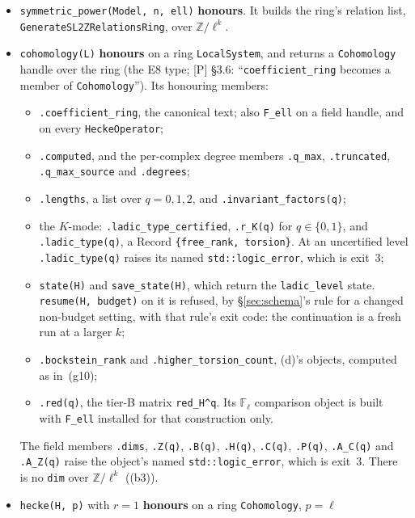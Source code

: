 \documentclass[11pt]{article}
\theoremstyle{remark}
\newcommand{\F}{\mathbb{F}}
\newcommand{\Z}{\mathbb{Z}}
\newcommand{\Fl}{\F_\ell}
\begin{document}
\begin{itemize}
\item \texttt{symmetric\_power(Model, n, ell)} \textbf{honours}. It builds the ring's relation
  list, \texttt{GenerateSL2ZRelationsRing}, over $\Z/\ell^k$.
\item \texttt{cohomology(L)} \textbf{honours} on a ring \texttt{LocalSystem}, and returns a
  \texttt{Cohomology} handle over the ring (the E8 type; [P] \S3.6: ``\texttt{coefficient\_ring}
  becomes a member of \texttt{Cohomology}''). Its honouring members:
  \begin{itemize}
  \item \texttt{.coefficient\_ring}, the canonical text; also \texttt{F\_ell} on a field handle,
    and on every \texttt{HeckeOperator};
  \item \texttt{.computed}, and the per-complex degree members \texttt{.q\_max},
    \texttt{.truncated}, \texttt{.q\_max\_source} and \texttt{.degrees};
  \item \texttt{.lengths}, a list over $q=0,1,2$, and \texttt{.invariant\_factors(q)};
  \item the $K$-mode: \texttt{.ladic\_type\_certified}, \texttt{.r\_K(q)} for $q\in\{0,1\}$, and
    \texttt{.ladic\_type(q)}, a Record \texttt{\{free\_rank, torsion\}}. At an uncertified level
    \texttt{.ladic\_type(q)} raises its named \texttt{std::logic\_error}, which is exit~$3$;
  \item \texttt{state(H)} and \texttt{save\_state(H)}, which return the \texttt{ladic\_level}
    state. \texttt{resume(H, budget)} on it is refused, by \S\ref{sec:schema}'s rule for a changed
    non-budget setting, with that rule's exit code: the continuation is a fresh run at a larger
    $k$;
  \item \texttt{.bockstein\_rank} and \texttt{.higher\_torsion\_count}, (d)'s objects, computed as
    in~(g10);
  \item \texttt{.red(q)}, the tier-B matrix \texttt{red\_H\textasciicircum q}. Its $\Fl$ comparison
    object is built with \texttt{F\_ell} installed for that construction only.
  \end{itemize}
  The field members \texttt{.dims}, \texttt{.Z(q)}, \texttt{.B(q)}, \texttt{.H(q)},
  \texttt{.C(q)}, \texttt{.P(q)}, \texttt{.A\_C(q)} and \texttt{.A\_Z(q)} raise the object's named
  \texttt{std::logic\_error}, which is exit~$3$. There is no \texttt{dim} over $\Z/\ell^k$
  ((b3)).
\item \texttt{hecke(H, p)} with $r=1$ \textbf{honours} on a ring \texttt{Cohomology}, $p=\ell$

\end{itemize}
\end{document}
